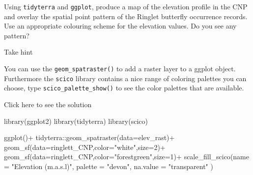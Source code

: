 \documentclass[
  letterpaper,
  DIV=11,
  numbers=noendperiod]{scrartcl}
\newenvironment{Shaded}{\begin{snugshade}}{\end{snugshade}}
\newcommand{\AttributeTok}[1]{\textcolor[rgb]{0.40,0.45,0.13}{#1}}
\newcommand{\DecValTok}[1]{\textcolor[rgb]{0.68,0.00,0.00}{#1}}
\newcommand{\FunctionTok}[1]{\textcolor[rgb]{0.28,0.35,0.67}{#1}}
\newcommand{\NormalTok}[1]{\textcolor[rgb]{0.00,0.23,0.31}{#1}}
\newcommand{\SpecialCharTok}[1]{\textcolor[rgb]{0.37,0.37,0.37}{#1}}
\newcommand{\StringTok}[1]{\textcolor[rgb]{0.13,0.47,0.30}{#1}}
\begin{document}
\begin{tcolorbox}[enhanced jigsaw, left=2mm, coltitle=black, breakable, leftrule=.75mm, colbacktitle=quarto-callout-warning-color!10!white, colframe=quarto-callout-warning-color-frame, rightrule=.15mm, colback=white, bottomtitle=1mm, opacitybacktitle=0.6, toptitle=1mm, titlerule=0mm, title={Task}, arc=.35mm, opacityback=0, bottomrule=.15mm, toprule=.15mm]

Using \texttt{tidyterra} and \texttt{ggplot}, produce a map of the
elevation profile in the CNP and overlay the spatial point pattern of
the Ringlet butterfly occurrence records. Use an appropriate colouring
scheme for the elevation values. Do you see any pattern?

Take hint

You can use the \texttt{geom\_spatraster()} to add a raster layer to a
ggplot object. Furthermore the \texttt{scico} library contains a nice
range of coloring palettes you can choose, type
\texttt{scico\_palette\_show()} to see the color palettes that are
available.

Click here to see the solution

\begin{Shaded}
\begin{Highlighting}[]
\FunctionTok{library}\NormalTok{(ggplot2)}
\FunctionTok{library}\NormalTok{(tidyterra)}
\FunctionTok{library}\NormalTok{(scico)}

\FunctionTok{ggplot}\NormalTok{()}\SpecialCharTok{+} 
\NormalTok{  tidyterra}\SpecialCharTok{::}\FunctionTok{geom\_spatraster}\NormalTok{(}\AttributeTok{data=}\NormalTok{elev\_rast)}\SpecialCharTok{+}
  \FunctionTok{geom\_sf}\NormalTok{(}\AttributeTok{data=}\NormalTok{ringlett\_CNP,}\AttributeTok{color=}\StringTok{"white"}\NormalTok{,}\AttributeTok{size=}\DecValTok{2}\NormalTok{)}\SpecialCharTok{+}
  \FunctionTok{geom\_sf}\NormalTok{(}\AttributeTok{data=}\NormalTok{ringlett\_CNP,}\AttributeTok{color=}\StringTok{"forestgreen"}\NormalTok{,}\AttributeTok{size=}\DecValTok{1}\NormalTok{)}\SpecialCharTok{+}
  \FunctionTok{scale\_fill\_scico}\NormalTok{(}\AttributeTok{name =} \StringTok{"Elevation (m.a.s.l)"}\NormalTok{,}
                   \AttributeTok{palette =} \StringTok{"devon"}\NormalTok{,}
                   \AttributeTok{na.value =} \StringTok{"transparent"}\NormalTok{ )}
\end{Highlighting}
\end{Shaded}


\end{tcolorbox}
\end{document}
